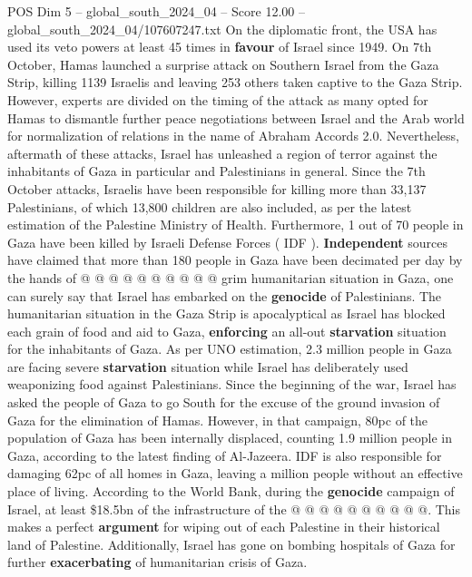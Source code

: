 \begin{textsample}{POS Dim 5 – global\_south\_2024\_04 – Score 12.00 – global\_south\_2024\_04/107607247.txt}  \label{ex:f5_pos_333}
On the diplomatic front, the USA has used its veto powers at least 45 times in \textbf{favour} of Israel since 1949.
On 7th October, Hamas launched a surprise attack on Southern Israel from the Gaza Strip, killing 1139 Israelis and leaving 253 others taken captive to the Gaza Strip.
However, experts are divided on the timing of the attack as many opted for Hamas to dismantle further peace negotiations between Israel and the Arab world for normalization of relations in the name of Abraham Accords 2.0.
Nevertheless, aftermath of these attacks, Israel has unleashed a region of terror against the inhabitants of Gaza in particular and Palestinians in general.
Since the 7th October attacks, Israelis have been responsible for killing more than 33,137 Palestinians, of which 13,800 children are also included, as per the latest estimation of the Palestine Ministry of Health.
Furthermore, 1 out of 70 people in Gaza have been killed by Israeli Defense Forces ( IDF ). \textbf{Independent} sources have claimed that more than 180 people in Gaza have been decimated per day by the hands of @ @ @ @ @ @ @ @ @ @ grim humanitarian situation in Gaza, one can surely say that Israel has embarked on the \textbf{genocide} of Palestinians.
The humanitarian situation in the Gaza Strip is apocalyptical as Israel has blocked each grain of food and aid to Gaza, \textbf{enforcing} an all-out \textbf{starvation} situation for the inhabitants of Gaza.
As per UNO estimation, 2.3 million people in Gaza are facing severe \textbf{starvation} situation while Israel has deliberately used weaponizing food against Palestinians.
Since the beginning of the war, Israel has asked the people of Gaza to go South for the excuse of the ground invasion of Gaza for the elimination of Hamas.
However, in that campaign, 80pc of the population of Gaza has been internally displaced, counting 1.9 million people in Gaza, according to the latest finding of Al-Jazeera.
IDF is also responsible for damaging 62pc of all homes in Gaza, leaving a million people without an effective place of living.
According to the World Bank, during the \textbf{genocide} campaign of Israel, at least \$18.5bn of the infrastructure of the @ @ @ @ @ @ @ @ @ @.
This makes a perfect \textbf{argument} for wiping out of each Palestine in their historical land of Palestine.
Additionally, Israel has gone on bombing hospitals of Gaza for further \textbf{exacerbating} of humanitarian crisis of Gaza.

\end{textsample}
